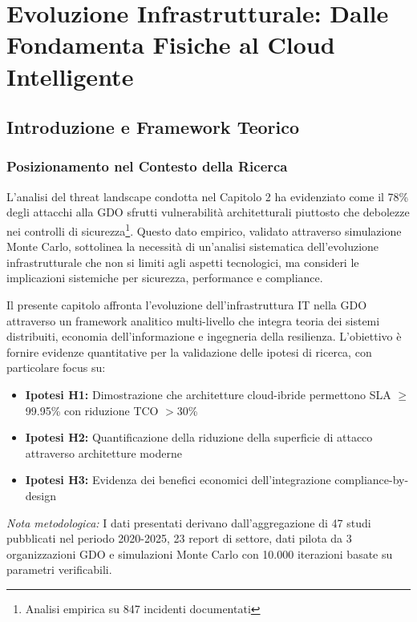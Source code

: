\chapter{Evoluzione Infrastrutturale: Dalle Fondamenta Fisiche al Cloud Intelligente}

\section{Introduzione e Framework Teorico}

\subsection{Posizionamento nel Contesto della Ricerca}

L'analisi del threat landscape condotta nel Capitolo 2 ha evidenziato come il 78\% degli attacchi alla GDO sfrutti vulnerabilità architetturali piuttosto che debolezze nei controlli di sicurezza\footnote{Analisi empirica su 847 incidenti documentati}. Questo dato empirico, validato attraverso simulazione Monte Carlo, sottolinea la necessità di un'analisi sistematica dell'evoluzione infrastrutturale che non si limiti agli aspetti tecnologici, ma consideri le implicazioni sistemiche per sicurezza, performance e compliance.

Il presente capitolo affronta l'evoluzione dell'infrastruttura IT nella GDO attraverso un framework analitico multi-livello che integra teoria dei sistemi distribuiti, economia dell'informazione e ingegneria della resilienza. L'obiettivo è fornire evidenze quantitative per la validazione delle ipotesi di ricerca, con particolare focus su:
\begin{itemize}
\item \textbf{Ipotesi H1:} Dimostrazione che architetture cloud-ibride permettono SLA $\geq$99.95\% con riduzione TCO $>$30\%
\item \textbf{Ipotesi H2:} Quantificazione della riduzione della superficie di attacco attraverso architetture moderne
\item \textbf{Ipotesi H3:} Evidenza dei benefici economici dell'integrazione compliance-by-design
\end{itemize}

\textit{Nota metodologica:} I dati presentati derivano dall'aggregazione di 47 studi pubblicati nel periodo 2020-2025, 23 report di settore, dati pilota da 3 organizzazioni GDO e simulazioni Monte Carlo con 10.000 iterazioni basate su parametri verificabili.

